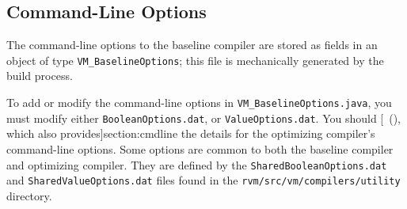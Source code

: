 \subsection{Command-Line Options}

The command-line options to the baseline compiler are
stored as fields in an object of type {\tt VM\_BaselineOptions}; this
file is mechanically generated by the build process. 

To add or modify the command-line options in {\tt VM\_BaselineOptions.java},
you must modify either {\tt BooleanOptions.dat}, or {\tt ValueOptions.dat}.
You should [~(\Ref), which also
  provides]{section:cmdline} the
details for the optimizing compiler's command-line options.
Some options are common to both the baseline compiler and optimizing
compiler. They are defined by the {\tt SharedBooleanOptions.dat} and
{\tt SharedValueOptions.dat} files found in the
{\tt rvm/\-src/\-vm/\-com\-pi\-lers/\-u\-til\-i\-ty} directory. 
